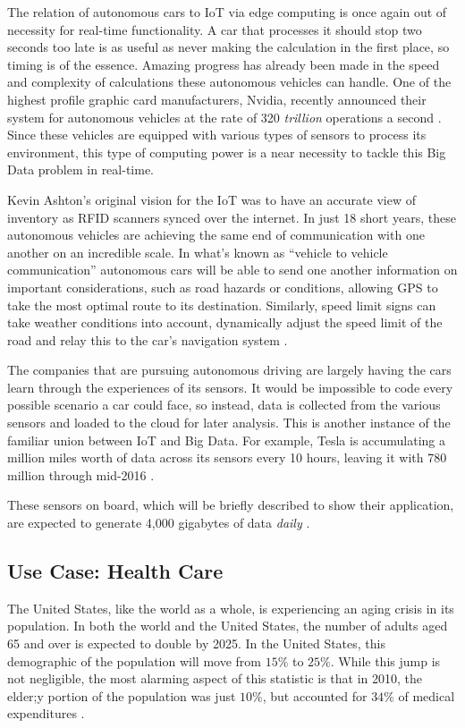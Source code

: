 \documentclass[sigconf]{acmart}
\begin{document}
The relation of autonomous cars to IoT via edge computing is once again out of necessity for real-time functionality. A car that processes it should stop two seconds too late is as useful as never making the calculation in the first place, so timing is of the essence. Amazing progress has already been made in the speed and complexity of calculations these autonomous vehicles can handle. One of the highest profile graphic card manufacturers, Nvidia, recently announced their system for autonomous vehicles at the rate of 320 \emph{trillion} operations a second \cite{nvidia}. Since these vehicles are equipped with various types of sensors to process its environment, this type of computing power is a near necessity to tackle this Big Data problem in real-time. 

Kevin Ashton's original vision for the IoT was to have an accurate view of inventory as RFID scanners synced over the internet. In just 18 short years, these autonomous vehicles are achieving the same end of communication with one another on an incredible scale. In what's known as ``vehicle to vehicle communication'' autonomous cars will be able to send one another information on important considerations, such as road hazards or conditions, allowing GPS to take the most optimal route to its destination. Similarly, speed limit signs can take weather conditions into account, dynamically adjust the speed limit of the road and relay this to the car's navigation system \cite{vehiclecomm}. 

The companies that are pursuing autonomous driving are largely having the cars learn through the experiences of its sensors. It would be impossible to code every possible scenario a car could face, so instead, data is collected from the various sensors and loaded to the cloud for later analysis. This is another instance of the familiar union between IoT and Big Data. For example, Tesla is accumulating a million miles worth of data across its sensors every 10 hours, leaving it with 780 million through mid-2016 \cite{tesla}.  

These sensors on board, which will be briefly described to show their application, are expected to generate 4,000 gigabytes of data \emph{daily} \cite{sensorcardata} \cite{howsensorswork}. 

\subsection{Use Case: Health Care}

The United States, like the world as a whole, is experiencing an aging crisis in its population. In both the world and the United States, the number of adults aged 65 and over is expected to double by 2025. In the United States, this demographic of the population will move from $15\%$ to $25\%$. While this jump is not negligible, the most alarming aspect of this statistic is that in 2010, the elder;y portion of the population was just $10\%$, but accounted for $34 \%$ of medical expenditures \cite{elderlypop}. 
\end{document}
